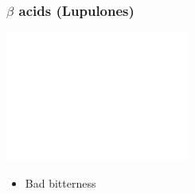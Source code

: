 \documentclass{beamer}
\begin{document}
\begin{frame}\frametitle{$\beta$ acids (Lupulones)}
  \includegraphics[width=.5\textwidth]{./brewing/hops/Lupulone-dark.pdf}
  \begin{itemize}
    \item Bad bitterness
  \end{itemize}
\end{frame}
\end{document}
